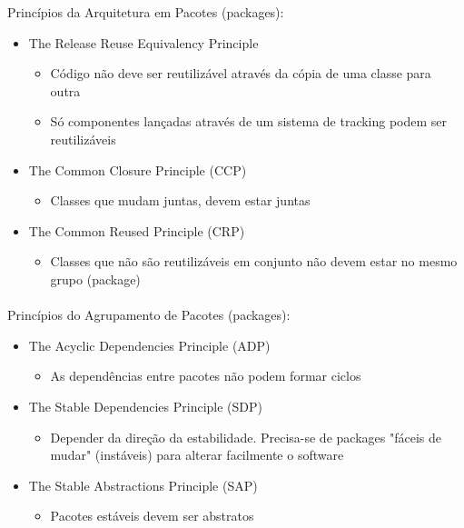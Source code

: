 \documentclass[../resumosLPOO.tex]{subfiles}
\begin{document}
Princípios da Arquitetura em Pacotes (packages):
\begin{itemize}
    \item The Release Reuse Equivalency Principle
    \begin{itemize}
        \item Código não deve ser reutilizável através da cópia de uma classe para outra
        \item Só componentes lançadas através de um sistema de tracking podem ser reutilizáveis
    \end{itemize}
    \item The Common Closure Principle (CCP)
    \begin{itemize}
        \item Classes que mudam juntas, devem estar juntas
    \end{itemize}
    \item The Common Reused Principle (CRP)
    \begin{itemize}
        \item Classes que não são reutilizáveis em conjunto não devem estar no mesmo grupo (package)
    \end{itemize}
\end{itemize}

\paragraph{}

Princípios do Agrupamento de Pacotes (packages):
\begin{itemize}
    \item The Acyclic Dependencies Principle (ADP)
    \begin{itemize}
        \item As dependências entre pacotes não podem formar ciclos
    \end{itemize}
    \item The Stable Dependencies Principle (SDP)
    \begin{itemize}
        \item Depender da direção da estabilidade. Precisa-se de packages "fáceis de mudar" (instáveis) para alterar facilmente o software
    \end{itemize}
    \item The Stable Abstractions Principle (SAP)
    \begin{itemize}
        \item Pacotes estáveis devem ser abstratos
    \end{itemize}
\end{itemize}
\end{document}
